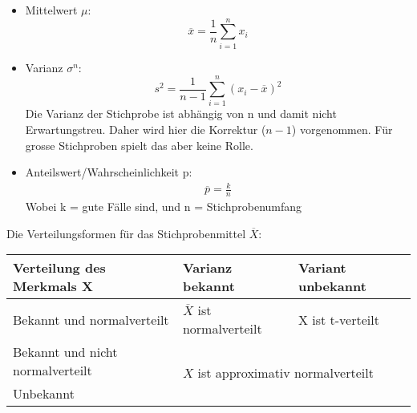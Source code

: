 \begin{itemize}
	\item Mittelwert $\mu$: 
	\begin{equation}
	\overline{x} = \frac{1}{n}\displaystyle\sum^{n}_{i=1} x_i
	\end{equation}
	\item Varianz $\sigma^{n}$: 
	\begin{equation}
	s^{2}=\frac{1}{n-1} \displaystyle\sum_{i=1}^{n}(x_i - \overline{x})^{2}
	\end{equation}
	Die Varianz der Stichprobe ist abhängig von n und damit nicht Erwartungstreu. Daher wird hier die Korrektur ($n-1$) vorgenommen. Für grosse Stichproben spielt das aber keine Rolle.
	\item Anteilswert/Wahrscheinlichkeit p: 
	\begin{eqnarray}
	\overline{p} = \frac{k}{n}
	\end{eqnarray}
	 Wobei k = gute Fälle sind, und n = Stichprobenumfang
\end{itemize}

Die Verteilungsformen für das Stichprobenmittel $\overline{X}$:
\begin{table}[ht]
\centering
\begin{tabular}{@{}l|ll@{}}
\toprule
Verteilung des Merkmals X & Varianz bekannt & Variant unbekannt \\ \midrule
Bekannt und normalverteilt & $\overline{X}$ ist normalverteilt & X ist t-verteilt \\ 
Bekannt und nicht normalverteilt & \multicolumn{2}{l}{\multirow{2}{*}{$X$ ist approximativ normalverteilt}} \\
Unbekannt & \multicolumn{2}{l}{} \\ \bottomrule
\end{tabular}
\end{table} \\
